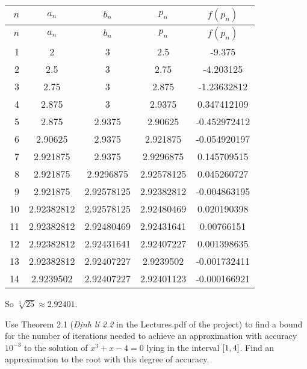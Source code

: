 \documentclass[../../Assignments.tex]{subfiles}
\begin{document}
\begin{solution}
    \begin{longtable}{r S[table-format=1.8] S[table-format=1.8] S[table-format=1.8] S[table-format=-1.9]}
        \toprule
        \(n\)  &   {\(a_n\)}   &   {\(b_n\)}   &   {\(p_n\)}   &  {\(f(p_n)\)}  \\
        \midrule
        \endfirsthead
        \(n\)  &   {\(a_n\)}   &   {\(b_n\)}   &   {\(p_n\)}   &  {\(f(p_n)\)}  \\
        \midrule
          &  2            &  3            &  2.5          &  -9.375        \\
            2  &  2.5          &  3            &  2.75         &  -4.203125     \\
            3  &  2.75         &  3            &  2.875        &  -1.23632812   \\
            4  &  2.875        &  3            &  2.9375       &   0.347412109  \\
            5  &  2.875        &  2.9375       &  2.90625      &  -0.452972412  \\
            6  &  2.90625      &  2.9375       &  2.921875     &  -0.054920197  \\
            7  &  2.921875     &  2.9375       &  2.9296875    &   0.145709515  \\
            8  &  2.921875     &  2.9296875    &  2.92578125   &   0.045260727  \\
            9  &  2.921875     &  2.92578125   &  2.92382812   &  -0.004863195  \\
           10  &  2.92382812   &  2.92578125   &  2.92480469   &   0.020190398  \\
           11  &  2.92382812   &  2.92480469   &  2.92431641   &   0.00766151   \\
           12  &  2.92382812   &  2.92431641   &  2.92407227   &   0.001398635  \\
           13  &  2.92382812   &  2.92407227   &  2.9239502    &  -0.001732411  \\
           14  &  2.9239502    &  2.92407227   &  2.92401123   &  -0.000166921  \\
       \bottomrule
    \end{longtable}

    So \(\sqrt[3]{25} \approx \num{2.92401}\).
\end{solution}

\begin{exercise}
    Use Theorem 2.1 (\emph{Định lí 2.2} in the Lectures.pdf of the project) to
    find a bound for the number of iterations needed to achieve an approximation
    with accuracy \(10^{-3}\) to the solution of \(x^3 + x − 4 = 0\) lying in
    the interval \(\interval{1}{4}\). Find an approximation to the root with
    this degree of accuracy.
\end{exercise}
\end{document}
